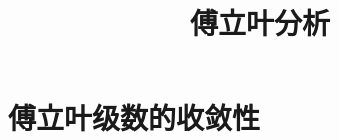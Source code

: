 \documentclass{book}
\begin{document}
\title{傅立叶分析}
\maketitle

\chapter{傅立叶级数的收敛性}


\cite{stein2003}


\end{document}
